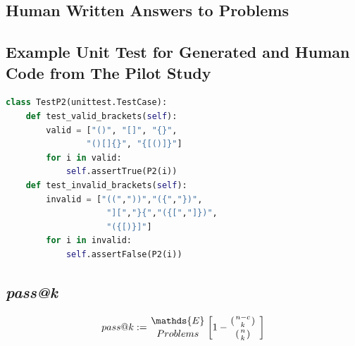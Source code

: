 \documentclass[manuscript,screen,review,sigconf]{acmart}
\newcommand\myatop[2]{{#1\atop#2}}
\begin{document}
\subsection{Human Written Answers to Problems}

\subsection{Example Unit Test for Generated and Human Code from The Pilot Study}
\begin{lstlisting}[language=Python]
class TestP2(unittest.TestCase):
    def test_valid_brackets(self):
        valid = ["()", "[]", "{}",
                "()[]{}", "{[()]}"]
        for i in valid:
            self.assertTrue(P2(i))
    def test_invalid_brackets(self):
        invalid = ["((","))","({","})",
                    "][","}{","({[","]})",
                    "({[)}]"]
        for i in invalid:
            self.assertFalse(P2(i))
\end{lstlisting}

\subsection{\textit{pass@k} \cite{CodexRelPaper}}

\[pass@k := \myatop{\mathds{E}}{Problems} \left[1-\myatop{(\myatop{n-c}{k})}{(\myatop{n}{k})}\ \right]\]
\end{document}
